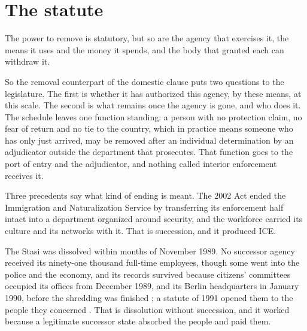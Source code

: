 \section{The statute}
\label{sec:11.4}
The power to remove is statutory, but so are the agency that exercises it, the means it uses and the money it spends, and the body that granted each can withdraw it.

So the removal counterpart of the domestic clause puts two questions to the legislature. The first is whether it has authorized this agency, by these means, at this scale. The second is what remains once the agency is gone, and who does it.
The schedule leaves one function standing: a person with no protection claim, no fear of return and no tie to the country, which in practice means someone who has only just arrived, may be removed after an individual determination by an adjudicator outside the department that prosecutes. That function goes to the port of entry and the adjudicator, and nothing called interior enforcement receives it.

Three precedents say what kind of ending is meant. The 2002 Act ended the Immigration and Naturalization Service by transferring its enforcement half intact into a department organized around security, and the workforce carried its culture and its networks with it. That is succession, and it produced ICE.

The Stasi was dissolved within months of November 1989. No successor agency received its ninety-one thousand full-time employees, though some went into the police and the economy, and its records survived because citizens' committees occupied its offices from December 1989, and its Berlin headquarters in January 1990, before the shredding was finished \autocite{bpb2023stasi}; a statute of 1991 opened them to the people they concerned \autocite{stug1991}. That is dissolution without succession, and it worked because a legitimate successor state absorbed the people and paid them.

